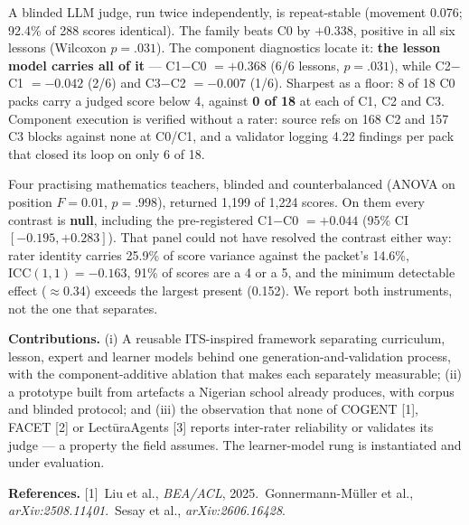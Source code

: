 \documentclass{article}
\begin{document}
A blinded LLM judge, run twice independently, is repeat-stable (movement 0.076;
92.4\% of 288 scores identical). The family beats C0 by $+0.338$, positive in all
six lessons (Wilcoxon $p=.031$). The component diagnostics locate it: \textbf{the lesson
model carries all of it} --- C1$-$C0 $=+0.368$ (6/6 lessons, $p=.031$), while
C2$-$C1 $=-0.042$ (2/6) and C3$-$C2 $=-0.007$ (1/6). Sharpest as a floor: 8 of 18 C0 packs
carry a judged score below 4, against \textbf{0 of 18} at each of C1, C2 and C3. Component execution is
verified without a rater: source refs on 168 C2 and 157 C3 blocks against none at C0/C1,
and a validator logging 4.22 findings per pack that closed its loop on only 6 of 18.

Four practising mathematics teachers, blinded and counterbalanced (ANOVA on position $F=0.01$, $p=.998$), returned 1{,}199 of 1{,}224 scores. On them every contrast
is \textbf{null}, including the pre-registered C1$-$C0 $=+0.044$ (95\% CI
$[-0.195,+0.283]$). That panel could not have resolved the contrast either way: rater
identity carries 25.9\% of score variance against the packet's 14.6\%,
$\mathrm{ICC}(1,1)=-0.163$, 91\% of scores are a 4 or a 5, and the minimum detectable
effect ($\approx$0.34) exceeds the largest present (0.152). We report both instruments, not the one that separates.

\vspace{0.15em}
\noindent\textbf{Contributions.} (i) A reusable ITS-inspired framework separating curriculum, lesson, expert and learner
models behind one generation-and-validation process, with the component-additive ablation
that makes each separately measurable; (ii) a prototype built from artefacts a Nigerian
school already produces, with corpus and blinded protocol; and (iii) the observation that
none of COGENT [1], FACET [2] or Lect\=uraAgents [3] reports inter-rater reliability or
validates its judge --- a property the field assumes. The learner-model rung is instantiated and under evaluation.

{\scriptsize\setlength{\parindent}{0pt}\vspace{0.1em}
\textbf{References.}
[1]~Liu et al., \emph{BEA/ACL}, 2025.\quad
[2]~Gonnermann-M\"uller et al., \emph{arXiv:2508.11401}.\quad
[3]~Sesay et al., \emph{arXiv:2606.16428}.
\par}
\end{document}
